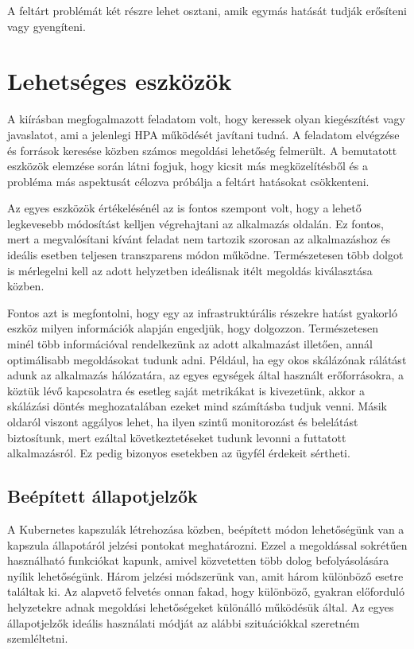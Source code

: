 A feltárt problémát két részre lehet osztani, amik egymás hatását tudják erősíteni vagy gyengíteni.

\section{Lehetséges eszközök}

A kiírásban megfogalmazott feladatom volt, hogy keressek olyan kiegészítést vagy javaslatot, ami a jelenlegi HPA működését javítani tudná.
A feladatom elvégzése és források keresése közben számos megoldási lehetőség felmerült.
A bemutatott eszközök elemzése során látni fogjuk, hogy kicsit más megközelítésből és a probléma más aspektusát célozva próbálja a feltárt hatásokat csökkenteni.

Az egyes eszközök értékelésénél az is fontos szempont volt, hogy a lehető legkevesebb módosítást kelljen végrehajtani az alkalmazás oldalán.
Ez fontos, mert a megvalósítani kívánt feladat nem tartozik szorosan az alkalmazáshoz és ideális esetben teljesen transzparens módon működne.
Természetesen több dolgot is mérlegelni kell az adott helyzetben ideálisnak itélt megoldás kiválasztása közben.

Fontos azt is megfontolni, hogy egy az infrastruktúrális részekre hatást gyakorló eszköz milyen információk alapján engedjük, hogy dolgozzon.
Természetesen minél több információval rendelkezünk az adott alkalmazást illetően, annál optimálisabb megoldásokat tudunk adni.
Például, ha egy okos skálázónak rálátást adunk az alkalmazás hálózatára, az egyes egységek által használt erőforrásokra, a köztük lévő kapcsolatra és esetleg saját metrikákat is kivezetünk, akkor a skálázási döntés meghozatalában ezeket mind számításba tudjuk venni.
Másik oldaról viszont aggályos lehet, ha ilyen szintű monitorozást és belelátást biztosítunk, mert ezáltal következtetéseket tudunk levonni a futtatott alkalmazásról.
Ez pedig bizonyos esetekben az ügyfél érdekeit sértheti.


\subsection{Beépített állapotjelzők}
A Kubernetes kapszulák létrehozása közben, beépített módon lehetőségünk van a kapszula állapotáról jelzési pontokat meghatározni.
Ezzel a megoldással sokrétűen használható funkciókat kapunk, amivel közvetetten több dolog befolyásolására nyílik lehetőségünk.
Három jelzési módszerünk van, amit három különböző esetre találtak ki.
Az alapvető felvetés onnan fakad, hogy különböző, gyakran előforduló helyzetekre adnak megoldási lehetőségeket különálló működésük által.
Az egyes állapotjelzők ideális használati módját az alábbi szituációkkal szeretném szemléltetni.

